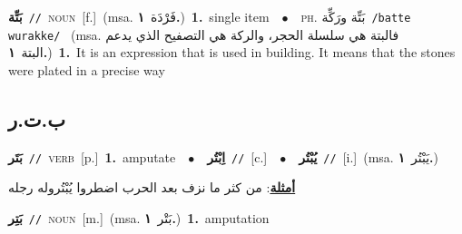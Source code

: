 \documentclass[10pt,a4paper,twoside]{article} %
\begin{document}
\begin{multicols}{2}
{\setlength\topsep{0pt}\textbf{\foreignlanguage{arabic}{بَتِّة}}\ {\color{gray}\texttt{//}\color{black}}\ \textsc{noun}\ [f.]\ \color{gray}(msa. \foreignlanguage{arabic}{فَرْدَة}~\foreignlanguage{arabic}{\textbf{١.}})\color{black}\ \textbf{1.}~single item\ \ $\bullet$\ \ \textsc{ph.} \color{gray} \foreignlanguage{arabic}{بَتِّة ورَكِّة}\color{black}\ {\color{gray}\texttt{/{\sffamily batte wurakke}/}\color{black}}\ \color{gray} (msa. \foreignlanguage{arabic}{فالبتة هي سلسلة الحجر، والركة هي التصفيح الذي يدعم البتة}~\foreignlanguage{arabic}{\textbf{١.}})\color{black}\ \textbf{1.}~It is an expression that is used in building. It means that the stones were plated in a precise way\ } \vspace{2mm}

\vspace{-3mm}
\subsection*{\color{blue}\foreignlanguage{arabic}{ب.ت.ر}\color{blue}{}} 

{\setlength\topsep{0pt}\textbf{\foreignlanguage{arabic}{بَتَر}}\ {\color{gray}\texttt{//}\color{black}}\ \textsc{verb}\ [p.]\ \textbf{1.}~amputate\ \ $\bullet$\ \ \setlength\topsep{0pt}\textbf{\foreignlanguage{arabic}{اِبْتُر}}\ {\color{gray}\texttt{//}\color{black}}\ [c.]\ \ $\bullet$\ \ \setlength\topsep{0pt}\textbf{\foreignlanguage{arabic}{يُبْتُر}}\ {\color{gray}\texttt{//}\color{black}}\ [i.]\ \color{gray}(msa. \foreignlanguage{arabic}{يَبْتُر}~\foreignlanguage{arabic}{\textbf{١.}})\color{black}\  \begin{flushright}\color{gray}\foreignlanguage{arabic}{\textbf{\underline{\foreignlanguage{arabic}{أمثلة}}}: من كثر ما نزف بعد الحرب اضطروا يُبْتُروله رجله}\end{flushright}\color{black}} \vspace{2mm}

{\setlength\topsep{0pt}\textbf{\foreignlanguage{arabic}{بَتِر}}\ {\color{gray}\texttt{//}\color{black}}\ \textsc{noun}\ [m.]\ \color{gray}(msa. \foreignlanguage{arabic}{بَتْر}~\foreignlanguage{arabic}{\textbf{١.}})\color{black}\ \textbf{1.}~amputation\ } \vspace{2mm}


\end{multicols}
\end{document}
